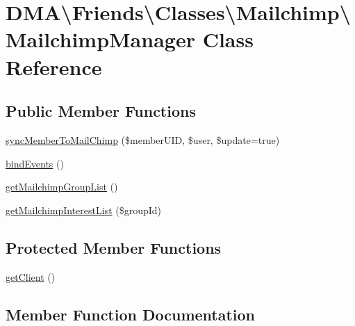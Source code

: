 \hypertarget{classDMA_1_1Friends_1_1Classes_1_1Mailchimp_1_1MailchimpManager}{}\section{D\+M\+A\textbackslash{}Friends\textbackslash{}Classes\textbackslash{}Mailchimp\textbackslash{}Mailchimp\+Manager Class Reference}
\label{classDMA_1_1Friends_1_1Classes_1_1Mailchimp_1_1MailchimpManager}
\subsection*{Public Member Functions}
\begin{DoxyCompactItemize}
\item 
\hyperlink{classDMA_1_1Friends_1_1Classes_1_1Mailchimp_1_1MailchimpManager_a7da9074bab17f451e618538d7b60277f}{sync\+Member\+To\+Mail\+Chimp} (\$member\+U\+I\+D, \$user, \$update=true)
\item 
\hyperlink{classDMA_1_1Friends_1_1Classes_1_1Mailchimp_1_1MailchimpManager_abc393ca42bfef769d0ec6b1bb54badd7}{bind\+Events} ()
\item 
\hyperlink{classDMA_1_1Friends_1_1Classes_1_1Mailchimp_1_1MailchimpManager_a1eaae431fd147ab7c9d0b68d17494426}{get\+Mailchimp\+Group\+List} ()
\item 
\hyperlink{classDMA_1_1Friends_1_1Classes_1_1Mailchimp_1_1MailchimpManager_adcc182bfef6124cd39fe1dd85dd108e2}{get\+Mailchimp\+Interest\+List} (\$group\+Id)
\end{DoxyCompactItemize}
\subsection*{Protected Member Functions}
\begin{DoxyCompactItemize}
\item 
\hyperlink{classDMA_1_1Friends_1_1Classes_1_1Mailchimp_1_1MailchimpManager_aea9e3ea5fe337ae33a9dd97b4c27cd38}{get\+Client} ()
\end{DoxyCompactItemize}


\subsection{Member Function Documentation}
\hypertarget{classDMA_1_1Friends_1_1Classes_1_1Mailchimp_1_1MailchimpManager_abc393ca42bfef769d0ec6b1bb54badd7}{}

